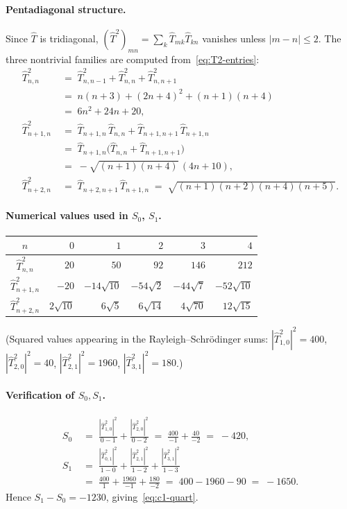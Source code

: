 \documentclass[11pt,a4paper]{article}
\theoremstyle{definition}
\begin{document}
\paragraph{Pentadiagonal structure.}
Since $\hat T$ is tridiagonal, $(\hat T^2)_{mn} = \sum_k \hat T_{mk}\hat T_{kn}$
vanishes unless $|m-n|\le 2$. The three nontrivial families are computed
from~\eqref{eq:T2-entries}:
\begin{align*}
\hat T^2_{n,n}
&\;=\; \hat T_{n,n-1}^2 + \hat T_{n,n}^2 + \hat T_{n,n+1}^2 \\
&\;=\; n(n+3) + (2n+4)^2 + (n+1)(n+4) \\
&\;=\; 6n^2 + 24n + 20, \\[3pt]
\hat T^2_{n+1,n}
&\;=\; \hat T_{n+1,n}\,\hat T_{n,n} + \hat T_{n+1,n+1}\,\hat T_{n+1,n} \\
&\;=\; \hat T_{n+1,n}\bigl(\hat T_{n,n}+\hat T_{n+1,n+1}\bigr) \\
&\;=\; -\sqrt{(n+1)(n+4)}\,(4n+10),\\[3pt]
\hat T^2_{n+2,n}
&\;=\; \hat T_{n+2,n+1}\,\hat T_{n+1,n}
\;=\; \sqrt{(n+1)(n+2)(n+4)(n+5)}.
\end{align*}

\paragraph{Numerical values used in $S_0$, $S_1$.}
\begin{center}
\begin{tabular}{c|rrrrr}
\toprule
$n$ & $0$ & $1$ & $2$ & $3$ & $4$ \\
\midrule
$\hat T^2_{n,n}$
& $20$ & $50$ & $92$ & $146$ & $212$ \\
$\hat T^2_{n+1,n}$
& $-20$ & $-14\sqrt{10}$ & $-54\sqrt{2}$ & $-44\sqrt{7}$ & $-52\sqrt{10}$ \\
$\hat T^2_{n+2,n}$
& $2\sqrt{10}$ & $6\sqrt{5}$ & $6\sqrt{14}$ & $4\sqrt{70}$ & $12\sqrt{15}$ \\
\bottomrule
\end{tabular}
\end{center}
(Squared values appearing in the Rayleigh--Schr\"odinger sums:
$|\hat T^2_{1,0}|^2 = 400$,
$|\hat T^2_{2,0}|^2 = 40$,
$|\hat T^2_{2,1}|^2 = 1960$,
$|\hat T^2_{3,1}|^2 = 180$.)

\paragraph{Verification of $S_0, S_1$.}
\begin{align*}
S_0 &\;=\; \frac{|\hat T^2_{1,0}|^2}{0-1} + \frac{|\hat T^2_{2,0}|^2}{0-2}
\;=\; \frac{400}{-1} + \frac{40}{-2} \;=\; -420,\\
S_1 &\;=\; \frac{|\hat T^2_{0,1}|^2}{1-0} + \frac{|\hat T^2_{2,1}|^2}{1-2} + \frac{|\hat T^2_{3,1}|^2}{1-3}\\
&\;=\; \frac{400}{1} + \frac{1960}{-1} + \frac{180}{-2}
\;=\; 400 - 1960 - 90 \;=\; -1650.
\end{align*}
Hence $S_1 - S_0 = -1230$, giving~\eqref{eq:c1-quart}.
\end{document}
